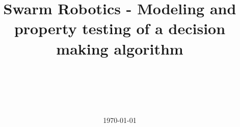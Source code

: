 \documentclass{article}
\title{Swarm Robotics - Modeling and property testing of a decision making algorithm}
\author{\medium{Andreas Riget Bagge (anrb),}\\ \medium{Marcus Skjold Pedersen (skmp),}\\ \medium{Peter Klarskov Døssing (pekd),} \\ \\ \medium{Supervisor: Mahsa Varshosaz (mahv)}}
\date{\today}
\begin{document}
\onehalfspacing
\maketitle

\newpage
\tableofcontents



















\newpage
\printbibliography

\newpage

\end{document}
